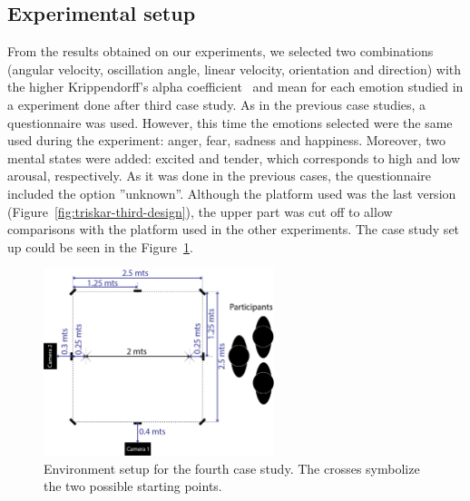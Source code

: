 \subsection{Experimental setup}
From the results obtained on our experiments, we selected two combinations (angular velocity, oscillation angle, linear velocity, orientation and direction) with the higher Krippendorff's alpha coefficient~\cite{Klaus2007} and mean for each emotion studied in a experiment done after third case study. As in the previous case studies, a questionnaire was used. However, this time the emotions selected were the same used during the experiment: anger, fear, sadness and happiness. Moreover, two mental states were added: excited and tender, which corresponds to high and low arousal, respectively. As it was done in the previous cases, the questionnaire included the option ''unknown''. Although the platform used was the last version (Figure~\ref{fig:triskar-third-design}), the upper part was cut off to allow comparisons with the platform used in the other experiments. The case study set up could be seen in the Figure~\ref{fig:setup_fourth}.
\begin{figure}
	\centering
	\includegraphics[width=0.60\textwidth]{./Images/FourthCase.png} 
	\caption{Environment setup for the fourth case study. The crosses symbolize the two possible starting points.}
	\label{fig:setup_fourth}
\end{figure} 
